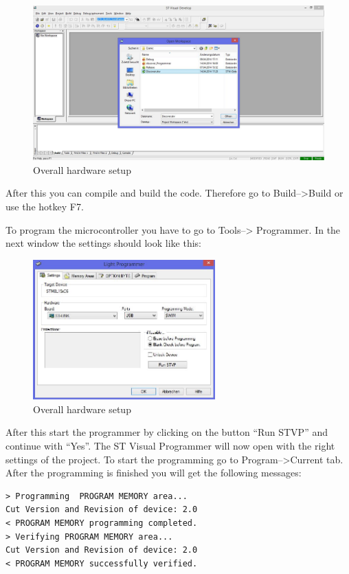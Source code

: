 \documentclass[11pt]{article}
\begin{document}
\begin{figure}[H]

 \centering
 \includegraphics [width=15cm]{STVD_project.jpg} 
 \caption{Overall hardware setup}
\end{figure}

After this you can compile and build the code. Therefore go to Build-->Build or use the hotkey F7.

To program the microcontroller you have to go to Tools--> Programmer. In the next window the settings should look like this:

\begin{figure}[H]

 \centering
 \includegraphics [width=7cm]{programmersettings.jpg} 
 \caption{Overall hardware setup}
\end{figure}

After this start the programmer by clicking on the button "`Run STVP"' and continue with "`Yes"'. The ST Visual Programmer will now open with the right settings of the project. To start the programming go to Program-->Current tab. After the programming is finished you will get the following messages:

\begin{lstlisting}
> Programming  PROGRAM MEMORY area...
Cut Version and Revision of device: 2.0
< PROGRAM MEMORY programming completed.
> Verifying PROGRAM MEMORY area...
Cut Version and Revision of device: 2.0
< PROGRAM MEMORY successfully verified.
\end{lstlisting}
\end{document}
